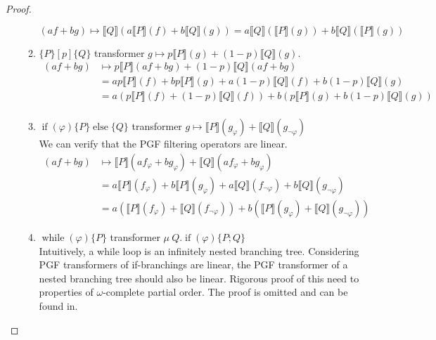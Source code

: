 \documentclass[a4paper]{article}
\renewcommand{\S}[1]{ \llbracket #1 \rrbracket }
\begin{document}
\begin{proof}
\begin{enumerate}
\begin{enumerate}
			            \[
				            (af+bg) \mapsto \S{Q}(a\S{P}(f) + b\S{Q}(g)) = a\S{Q}(\S{P}(g)) + b \S{Q}(\S{P}(g))
			            \]
			      \item \(\{P\}[p]\{Q\}\) transformer \(g\mapsto p\S{P}(g) + (1-p)\S{Q}(g)\).
			            \begin{align*}
				            (af+bg) & \mapsto  p\S{P}(af+bg) + (1-p)\S{Q}(af+bg)                                             \\
				                    & = ap\S{P}(f) + bp\S{P}(g) + a(1-p)\S{Q}(f) + b(1-p)\S{Q}(g)                            \\
				                    & = a\left(p\S{P}(f) + (1-p)\S{Q}(f)\right) + b\left( p\S{P}(g) + b(1-p)\S{Q}(g) \right) \\
			            \end{align*}
			      \item \(\operatorname{if}(\varphi)\{P\}\operatorname{else}\{Q\}\) transformer \(g\mapsto \S{P}(g_{\varphi}) + \S{Q}(g_{\lnot\varphi})\)\\
			            We can verify that the PGF filtering operators are linear.
			            \begin{align*}
				            (af+bg) & \mapsto \S{P}(a f_{\varphi} + b g_{\varphi}) + \S{Q}(a f_{\varphi} + b g_{\varphi})                                           \\
				                    & = a\S{P}(f_{\varphi}) + b\S{P}(g_{\varphi})  + a\S{Q}(f_{\lnot\varphi}) + b\S{Q}(g_{\lnot\varphi})                            \\
				                    & = a\left( \S{P}(f_{\varphi}) + \S{Q}(f_{\lnot\varphi}) \right) + b\left( \S{P}(g_{\varphi}) + \S{Q}(g_{\lnot\varphi}) \right)
			            \end{align*}
			      \item \(\operatorname{while}(\varphi)\{P\}\) transformer \(\mu\ Q . \operatorname{if}(\varphi)\{P;Q\}\)\\
			            Intuitively, a while loop is an infinitely nested branching tree.
			            Considering PGF transformers of if-branchings are linear, the PGF transformer of a nested branching tree should also be linear.
			            Rigorous proof of this need to properties of \(\omega\)-complete partial order. The proof is omitted and can be found in\cite{cav-extended}.
		      \end{enumerate}
	\end{enumerate}
\end{proof}
\end{document}
